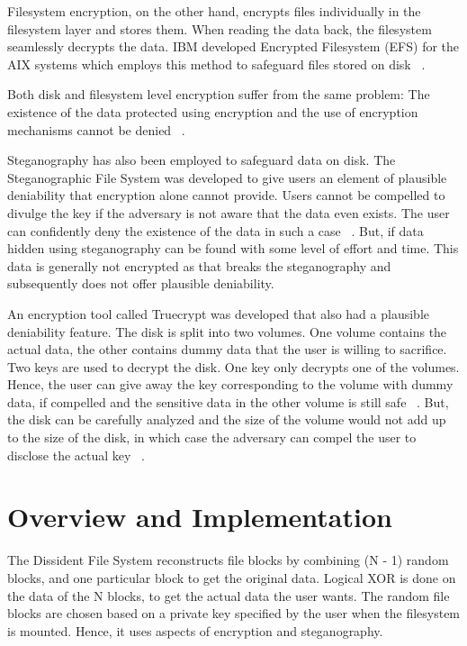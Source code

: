 \documentclass[10pt,twocolumn]{article}
\begin{document}
Filesystem encryption, on the other hand, encrypts files individually in the filesystem layer and stores them. When reading the data back, the filesystem seamlessly decrypts the data. IBM developed Encrypted Filesystem (EFS) for the AIX systems which employs this method to safeguard files stored on disk ~\cite{ex9}. 

Both disk and filesystem level encryption suffer from the same problem: The existence of the data protected using encryption and the use of encryption mechanisms cannot be denied ~\cite{ex2}. 

Steganography has also been employed to safeguard data on disk. The Steganographic File System was developed to give users an element of plausible deniability that encryption alone cannot provide. Users cannot be compelled to divulge the key if the adversary is not aware that the data even exists. The user can confidently deny the existence of the data in such a case ~\cite{ex10}. But, if data hidden using steganography can be found with some level of effort and time. This data is generally not encrypted as that breaks the steganography and subsequently does not offer plausible deniability. 

An encryption tool called Truecrypt was developed that also had a plausible deniability feature. The disk is split into two volumes. One volume contains the actual data, the other contains dummy data that the user is willing to sacrifice. Two keys are used to decrypt the disk. One key only decrypts one of the volumes. Hence, the user can give away the key corresponding to the volume with dummy data, if compelled and the sensitive data in the other volume is still safe ~\cite{ex2}. But, the disk can be carefully analyzed and the size of the volume would not add up to the size of the disk, in which case the adversary can compel the user to disclose the actual key ~\cite{ex11}. 

\section{Overview and Implementation}

The Dissident File System reconstructs file blocks by combining (N - 1) random blocks, and one particular block to get the original data. Logical XOR is done on the data of the N blocks, to get the actual data the user wants. The random file blocks are chosen based on a private key specified by the user when the filesystem is mounted. Hence, it uses aspects of encryption and steganography. 
\end{document}
